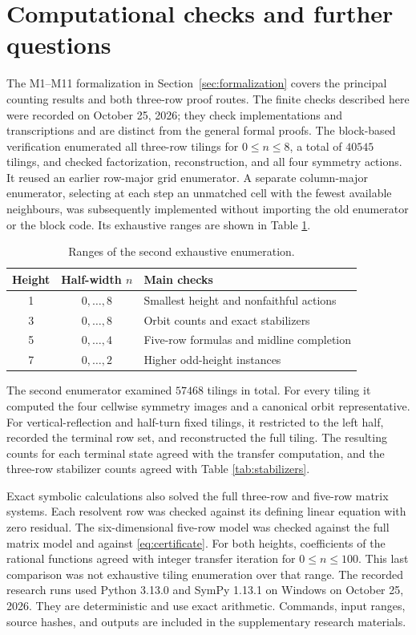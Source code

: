 \section{Computational checks and further questions}\label{sec:computation}

The M1--M11 formalization in Section~\ref{sec:formalization} covers
the principal counting results and both three-row proof routes.
The finite checks described here were recorded on October 25, 2026;
they check implementations and transcriptions and are distinct from
the general formal proofs.
The block-based verification enumerated all three-row tilings
for $0\le n\le8$, a total of $40545$ tilings, and checked
factorization, reconstruction, and all four symmetry actions.
It reused an earlier row-major grid enumerator.
A separate column-major enumerator, selecting at each step
an unmatched cell with the fewest available neighbours,
was subsequently implemented without importing the old
enumerator or the block code.
Its exhaustive ranges are shown in Table \ref{tab:checks}.

\begin{table}[htbp]
\centering
\caption{Ranges of the second exhaustive enumeration.}
\label{tab:checks}
\begin{tabular}{ccl}
\toprule
Height & Half-width $n$ & Main checks\\
\midrule
1 & $0,\ldots,8$ & Smallest height and nonfaithful actions\\
3 & $0,\ldots,8$ & Orbit counts and exact stabilizers\\
5 & $0,\ldots,4$ & Five-row formulas and midline completion\\
7 & $0,\ldots,2$ & Higher odd-height instances\\
\bottomrule
\end{tabular}
\end{table}

The second enumerator examined $57468$ tilings in total.
For every tiling it computed the four cellwise symmetry
images and a canonical orbit representative.
For vertical-reflection and half-turn fixed tilings, it
restricted to the left half, recorded the terminal row set,
and reconstructed the full tiling.
The resulting counts for each terminal state agreed with
the transfer computation, and the three-row stabilizer
counts agreed with Table \ref{tab:stabilizers}.

Exact symbolic calculations also solved the full three-row
and five-row matrix systems. Each resolvent row was checked
against its defining linear equation with zero residual.
The six-dimensional five-row model was checked against
the full matrix model and against \eqref{eq:certificate}.
For both heights, coefficients of the rational functions
agreed with integer transfer iteration for $0\le n\le100$.
This last comparison was not exhaustive tiling enumeration
over that range.
The recorded research runs used Python 3.13.0 and SymPy
1.13.1 on Windows on October 25, 2026.
They are deterministic and use exact arithmetic.
Commands, input ranges, source hashes, and outputs are
included in the supplementary research materials.

